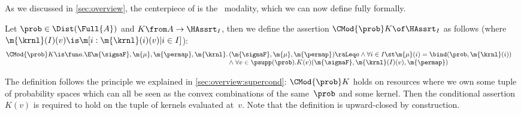 \subsection{\SuperCond}


As we discussed in \cref{sec:overview},
the centerpiece of \thelogic{} is the \supercond\ modality,
which we can now define fully formally.


\begin{definition}
  \label{def:c-mod}
  Let $ \prob \in \Dist(\Full{A}) $
  and $ K \from A \to \HAssrt_I $,
  then we define the assertion
  $ \CMod{\prob} K \of \HAssrt_I $
  as follows
  (where $ \m{\krnl}(I)(v) \is \m[i: \m{\krnl}(i)(v) | i \in I] $):
  \begin{align*}
    \CMod{\prob} K &\is
    \fun a.
    \begin{array}[t]{@{}r@{\,}l@{}}
      \E \m{\sigmaF}, \m{\mu}, \m{\permap}, \m{\krnl}.
      & (\m{\sigmaF}, \m{\mu}, \m{\permap}) \raLeq a
      \land
      \forall i\in I\st
      \m{\mu}(i) = \bind(\prob, \m{\krnl}(i))
   \\ & \land \;
   \forall v \in \psupp(\prob).
   K(v)(\m{\sigmaF}, \m{\krnl}(I)(v), \m{\permap})
    \end{array}
  \end{align*}

\end{definition}
The definition follows the principle we explained in
\cref{sec:overview:supercond}:
$ \CMod{\prob} K $ holds on resources where we own some
tuple of probability spaces which can all be seen
as the convex combinations of the same~$\prob$ and some kernel.
Then the conditional assertion~$K(v)$ is required to hold on the
tuple of kernels evaluated at~$v$.
Note that the definition is upward-closed by construction.


